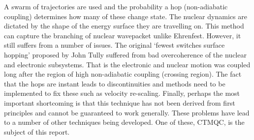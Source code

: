 A swarm of trajectories are used and the probability a hop (non-adiabatic coupling) determines how many of these change state. The nuclear dynamics are dictated by the shape of the energy surface they are travelling on. This method can capture the branching of nuclear wavepacket unlike Ehrenfest. However, it still suffers from a number of issues. The original `fewest switches surface hopping' proposed by John Tully suffered from bad overcoherence of the nuclear and electronic subsystems. That is the electronic and nuclear motion was coupled long after the region of high non-adiabatic coupling (crossing region). The fact that the hops are instant leads to discontinuities and methods need to be implemented to fix these such as velocity re-scaling. Finally, perhaps the most important shortcoming is that this technique has not been derived from first principles and cannot be guaranteed to work generally. These problems have lead to a number of other techniques being developed. One of these, CTMQC, is the subject of this report.

